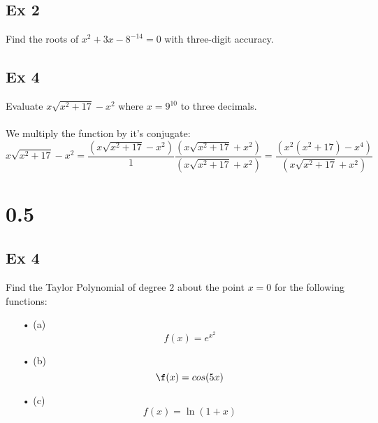 \documentclass[12pt,letterpaper]{article}
\begin{document}

\subsection*{Ex 2}
Find the roots of $x^2  + 3x - 8^{-14} = 0$ with three-digit accuracy.



\subsection*{Ex 4}
Evaluate $x\sqrt{x^2 + 17} - x^2$ where $x = 9^{10}$  to three decimals.

\paragraph*{}We multiply the function by it's conjugate:
\begin{equation}
x\sqrt{x^2 + 17} - x^2 = 
\frac{(x\sqrt{x^2 + 17} - x^2)}{1}\frac{(x\sqrt{x^2 + 17} + x^2)}{(x\sqrt{x^2 + 17} + x^2)} =
\frac{(x^2(x^2 + 17) - x^4)}{(x\sqrt{x^2 + 17} + x^2)}
\end{equation}


\section*{0.5}


\subsection*{Ex 4}
Find the Taylor Polynomial of degree $2$ about the point $x = 0$ for the following functions:

\begin{itemize}

\item[•] (a)
\begin{equation}
f(x) = e^x^2
\end{equation}

\item[•] (b)
\begin{equation}
\f(x) = cos(5x)
\end{equation}

\item[•] (c)
\begin{equation}
f(x) = \ln(1 + x)
\end{equation}

\end{itemize}
\end{document}
